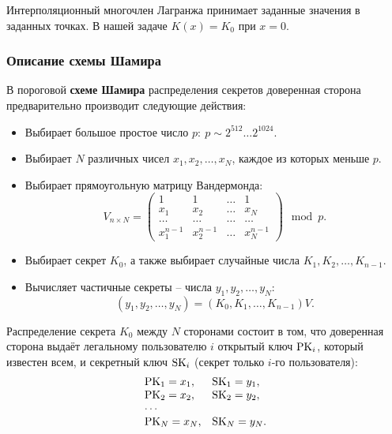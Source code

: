 Интерполяционный многочлен Лагранжа принимает заданные значения в заданных точках. В нашей задаче $K(x)=K_{0}$ при $x=0$.


\subsubsection{Описание схемы Шамира}

В пороговой \textbf{схеме Шамира} распределения секретов доверенная сторона предварительно производит следующие действия:
\begin{itemize}
    \item Выбирает большое простое число $p: ~ p \sim 2^{512} \dots 2^{1024}$.
    \item Выбирает $N$ различных чисел $x_1, x_2, \dots, x_N$, каждое из которых меньше $p$.
    \item Выбирает прямоугольную матрицу Вандермонда:
        \[
            V_{n \times N} = \left( \begin{array}{cccc}
                {1} & {1} & { \ldots } & {1} \\
                {x_{1} } & {x_{2} } & { \ldots } & {x_{N} } \\
                { \ldots } & { \ldots } & { \ldots } & { \ldots } \\
                {x_{1}^{n-1} } & {x_{2}^{n-1} } & { \ldots } & {x_{N}^{n-1} }
            \end{array} \right) \mod p.
        \]
    \item Выбирает секрет $K_0$, а также выбирает случайные числа $K_1, K_2, \dots, K_{n-1}$.
    \item Вычисляет частичные секреты -- числа $y_1, y_2, \dots, y_N$:
        \[ (y_1, y_2, \dots, y_N) = (K_0, K_1, \dots, K_{n-1}) V. \]
\end{itemize}

Распределение секрета $K_0$ между $N$ сторонами состоит в том, что доверенная сторона выдаёт легальному пользователю $i$ открытый ключ $\textrm{PK}_i$, который известен всем, и секретный ключ $\textrm{SK}_i$ (секрет только $i$-го пользователя):
\[ \begin{array}{ll}
    \textrm{PK}_1 = x_1, & \textrm{SK}_1 = y_1, \\
    \textrm{PK}_2 = x_2, & \textrm{SK}_2 = y_2, \\
    \cdots & \\
    \textrm{PK}_N = x_N, & \textrm{SK}_N = y_N. \\
\end{array} \]

